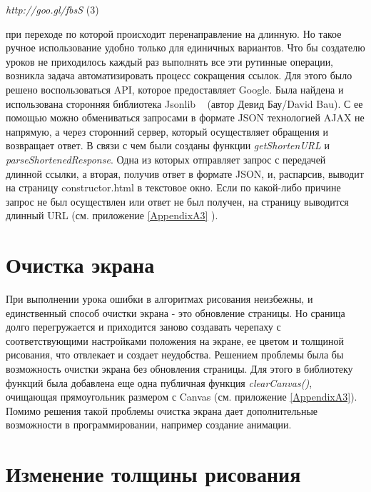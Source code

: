 \begin{center}
\vspace{6mm}
 \textit{ http://goo.gl/fbsS } (3)\par
\end{center}

при переходе по которой происходит перенаправление на длинную. Но такое ручное использование удобно только для единичных вариантов. Что бы создателю уроков не приходилось каждый раз выполнять все эти рутинные операции, возникла задача автоматизировать процесс сокращения ссылок. Для этого было решено воспользоваться API, которое предоставляет Google. Была найдена и использована сторонняя библиотека Jsonlib ~\cite{jsonlib} (автор Девид Бау/David Bau). С ее помощью можно обмениваться запросами в формате JSON технологией AJAX не напрямую, а через сторонний сервер, который осуществляет обращения и возвращает ответ. В связи с чем были созданы функции \textit{getShortenURL} и \textit{parseShortenedResponse}. Одна из которых отправляет запрос с передачей длинной ссылки, а вторая, получив ответ в формате JSON, и, распарсив, выводит на страницу constructor.html в текстовое окно. Если по какой-либо причине запрос не был осуществлен или ответ не был получен, на страницу выводится  длинный URL (см. приложение \ref{AppendixA3} ).


\chapter{Очистка экрана} \label{chapt1}
При выполнении урока ошибки в алгоритмах рисования неизбежны, и единственный способ очистки экрана - это обновление страницы. Но сраница долго перегружается и приходится заново создавать черепаху с соответствующими настройками положения на экране, ее цветом и толщиной рисования, что отвлекает и создает неудобства. Решением проблемы была бы возможность очистки экрана без обновления страницы. Для этого в библиотеку функций была добавлена еще одна публичная функция \textit{clearCanvas()}, очищающая прямоугольник размером с Canvas (см. приложение \ref{AppendixA3}). Помимо решения такой проблемы очистка экрана дает дополнительные возможности в программировании, например создание анимации.

\chapter{Изменение толщины рисования} \label{chapt1}

